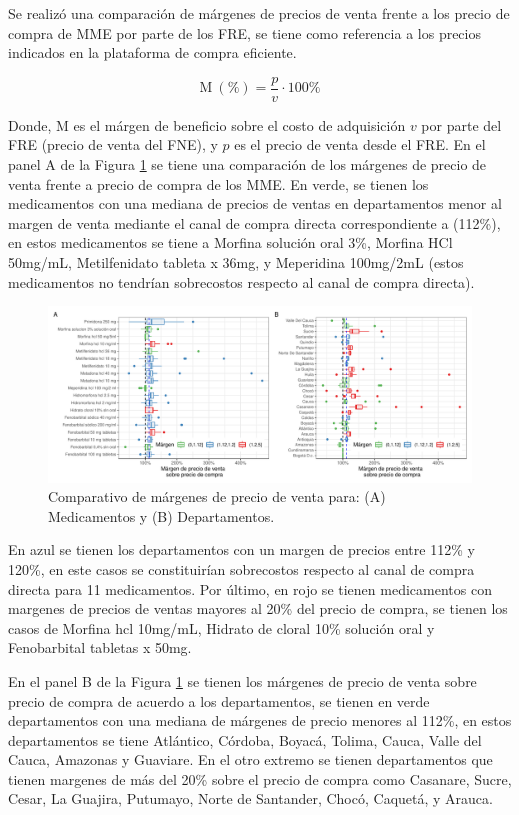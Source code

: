 \documentclass[
  oneside]{book}
\begin{document}
Se realizó una comparación de márgenes de precios de venta frente a los precio de compra de MME por parte de los FRE, se tiene como referencia a los precios indicados en la plataforma de compra eficiente.

\[\mathrm{M}~(\%) = \frac{p}{v} \cdot 100\%\]

Donde, \(\mathrm{M}\) es el márgen de beneficio sobre el costo de adquisición \(v\) por parte del FRE (precio de venta del FNE), y \(p\) es el precio de venta desde el FRE. En el panel A de la Figura \ref{fig:boxplotComparativoPVTA} se tiene una comparación de los márgenes de precio de venta frente a precio de compra de los MME. En verde, se tienen los medicamentos con una mediana de precios de ventas en departamentos menor al margen de venta mediante el canal de compra directa correspondiente a (112\%), en estos medicamentos se tiene a Morfina solución oral 3\%, Morfina HCl 50mg/mL, Metilfenidato tableta x 36mg, y Meperidina 100mg/2mL (estos medicamentos no tendrían sobrecostos respecto al canal de compra directa).

\begin{figure}[t]
\includegraphics[width=1\linewidth]{InformeFinal_files/figure-latex/boxplotComparativoPVTA-1} \caption{Comparativo de márgenes de precio de venta para: (A) Medicamentos y (B) Departamentos.}\label{fig:boxplotComparativoPVTA}
\end{figure}

En azul se tienen los departamentos con un margen de precios entre 112\% y 120\%, en este casos se constituirían sobrecostos respecto al canal de compra directa para 11 medicamentos. Por último, en rojo se tienen medicamentos con margenes de precios de ventas mayores al 20\% del precio de compra, se tienen los casos de Morfina hcl 10mg/mL, Hidrato de cloral 10\% solución oral y Fenobarbital tabletas x 50mg.

En el panel B de la Figura \ref{fig:boxplotComparativoPVTA} se tienen los márgenes de precio de venta sobre precio de compra de acuerdo a los departamentos, se tienen en verde departamentos con una mediana de márgenes de precio menores al 112\%, en estos departamentos se tiene Atlántico, Córdoba, Boyacá, Tolima, Cauca, Valle del Cauca, Amazonas y Guaviare. En el otro extremo se tienen departamentos que tienen margenes de más del 20\% sobre el precio de compra como Casanare, Sucre, Cesar, La Guajira, Putumayo, Norte de Santander, Chocó, Caquetá, y Arauca.
\end{document}

